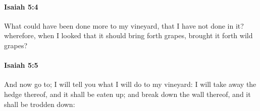 		\paragraph{Isaiah 5:4} %
			\label{ISAIAH-5-4}

			What could have been done more to my vineyard, that I have not done in it? wherefore, when I looked that it should bring forth grapes, brought it forth wild grapes?


		\paragraph{Isaiah 5:5} %
			\label{ISAIAH-5-5}

			And now go to; I will tell you what I will do to my vineyard: I will take away the hedge thereof, and it shall be eaten up; and break down the wall thereof, and it shall be trodden down:


